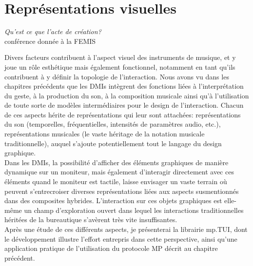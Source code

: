 %
\chapter{Représentations visuelles}
\label{ch:visual_representation}

{\textit{Qu'est ce que l'acte de création?}\\
conférence donnée à la FEMIS \cite{deleuze_deux_2003}}

\vspace*{\fill}


\noindent Divers facteurs contribuent à l'aspect visuel des instruments de musique, et y joue un rôle esthétique mais également fonctionnel, notamment en tant qu'ils contribuent à y définir la topologie de l'interaction. Nous avons vu dans les chapitres précédents que les \glspl{DMI} intègrent des fonctions liées à l'interprétation du geste, à la production du son, à la composition musicale ainsi qu'à l'utilisation de toute sorte de modèles intermédiaires pour le design de l'interaction. Chacun de ces aspects hérite de représentations qui leur sont attachées: représentations du son (temporelles, fréquentielles, intensités de paramètres audio, etc.), représentations musicales (le vaste héritage de la notation musicale traditionnelle), auquel s'ajoute potentiellement tout le langage du design graphique.\\
\indent Dans les \glspl{DMI}, la possibilité d'afficher des éléments graphiques de manière dynamique sur un moniteur, mais également d'interagir directement avec ces éléments quand le moniteur est tactile, laisse envisager un vaste terrain où peuvent s'entrecroiser diverses représentations liées aux aspects susmentionnés dans des composites hybrides. L'interaction sur ces objets graphiques est elle-même un champ d'exploration ouvert dans lequel les interactions traditionnelles héritées de la bureautique s'avèrent très vite insuffisantes.\\
\indent Après une étude de ces différents aspects, je présenterai la librairie mp.TUI, dont le développement illustre l'effort entrepris dans cette perspective, ainsi qu'une application pratique de l'utilisation du protocole MP décrit au chapitre précédent.

